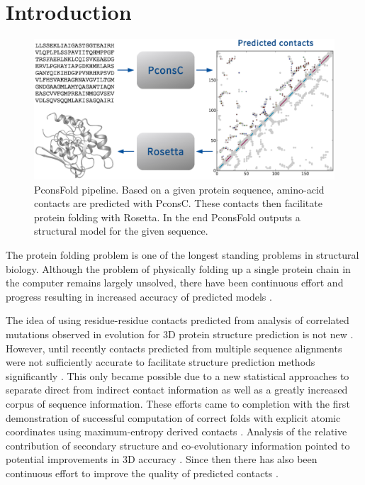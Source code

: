 \documentclass{bioinfo}
\begin{document}
\section{Introduction}
\begin{figure}[!tpb]%
\centerline{\includegraphics[scale=0.35]{figures/pipeline.eps}}
\caption{PconsFold pipeline. Based on a given protein sequence,
 amino-acid contacts are predicted with PconsC. These contacts then
 facilitate protein folding with Rosetta. In the end PconsFold
 outputs a structural model for the given
 sequence.}\label{fig:pipeline} 
\end{figure}

The protein folding problem is one of the
longest standing problems in structural biology. Although the problem
of physically folding up a single protein chain in the computer
remains largely unsolved, there have been continuous effort and
progress resulting in increased accuracy of predicted models
\cite[]{kryshtafovych_CASP10_2013}.

The idea of using residue-residue contacts predicted from analysis of
correlated mutations observed in evolution for 3D protein structure
prediction is not new
\cite[]{gobel_correlated_1994,Neher8278414,Hatrick16649265,Shindyalov_can_1994,Vendruscolo9377713}.
However, until recently contacts predicted from multiple sequence
alignments were not sufficiently accurate to facilitate structure
prediction methods significantly \cite[]{marks_protein_2012}.  This
only became possible due to a new statistical approaches to separate
direct from indirect contact information \cite[]{Lapedes1999,
Lapedes2002, Weigt19116270,burger_disentangling_2010,
morcos_direct-coupling_2011, marks_protein_2011} as well as a greatly
increased corpus of sequence information. These efforts came to
completion with the first demonstration of successful computation of
correct folds with explicit atomic coordinates using maximum-entropy
derived contacts \cite[]{marks_protein_2011}. Analysis of the relative
contribution of secondary structure and co-evolutionary information
pointed to potential improvements in 3D accuracy
\cite[]{Sulkowska22691493}. Since then there has also been continuous
effort to improve the quality of predicted contacts
\cite[]{jones_psicov:_2012, ekeberg_improved_2013,
skwark_PconsC:_2013}.
\end{document}
